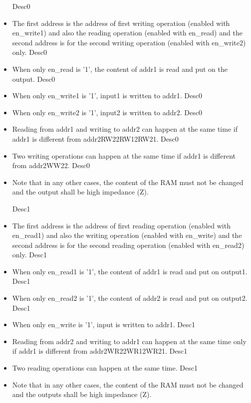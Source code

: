 \documentclass[a4paper,12pt]{article}
\begin{document}
\begin{itemize}
{{Desc0}}\item The first address is the address of first writing operation (enabled with en\_write1) and also the reading operation (enabled with en\_read) and the second address is for the second writing operation (enabled with en\_write2) only.
{{Desc0}}\item When only en\_read is '1', the content of addr1 is read and put on the output.
{{Desc0}}\item When only en\_write1 is '1', input1 is written to addr1.
{{Desc0}}\item When only en\_write2 is '1', input2 is written to addr2.
{{Desc0}}\item Reading from addr1 and writing to addr2 can happen at the same time if addr1 is different from addr2{{RW22}}{{RW12}}{{RW21}}.
{{Desc0}}\item Two writing operations can happen at the same time if addr1 is different from addr2{{WW22}}.
{{Desc0}}\item Note that in any other cases, the content of the RAM must not be changed and the output shall be high impedance (Z).


{{Desc1}}\item The first address is the address of first reading operation (enabled with en\_read1) and also the writing operation (enabled with en\_write) and the second address is for the second reading operation (enabled with en\_read2) only.
{{Desc1}}\item When only en\_read1 is '1', the content of addr1 is read and put on output1.
{{Desc1}}\item When only en\_read2 is '1', the content of addr2 is read and put on output2.
{{Desc1}}\item When only en\_write is '1', input is written to addr1.
{{Desc1}}\item Reading from addr2 and writing to addr1 can happen at the same time only if addr1 is different from addr2{{WR22}}{{WR12}}{{WR21}}.
{{Desc1}}\item Two reading operations can happen at the same time.
{{Desc1}}\item Note that in any other cases, the content of the RAM must not be changed and the outputs shall be high impedance (Z).



\end{itemize}
\end{document}
